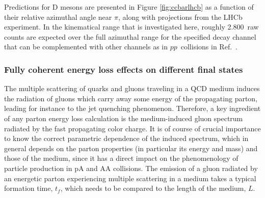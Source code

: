 \documentclass[../report.tex]{subfiles}
\begin{document}
Predictions for D mesons are presented in Figure \ref{fig:ccbarlhcb} as a function of their relative azimuthal angle near $\pi$, along with projections from the LHCb experiment. In the \pPb kinematical range that is investigated here, roughly 2.800~raw counts are expected over the full azimuthal range for the specified decay channel that can be complemented with other channels as in $pp$~collisions in Ref.~\cite{Aaij:2012dz}. %




\subsubsection{Fully coherent energy loss effects on different final states}
\label{subsubsec:coherent}

The multiple scattering of quarks and gluons traveling in a QCD medium induces the radiation of gluons which carry away some energy of the propagating parton, leading for instance to the jet quenching phenomenon. Therefore, a key ingredient of any parton energy loss calculation is  the medium-induced gluon spectrum radiated by the fast propagating color charge. It is of course of crucial importance to know the correct parametric dependence of the induced spectrum, which in general depends on the parton properties (in particular its energy and mass) and those of the medium, since it has a direct impact on the phenomenology of particle production in pA and AA collisions. The emission of a gluon radiated by an energetic parton experiencing multiple scattering in a medium takes a typical formation time, $t_f$, which needs to be compared to the length of the medium, $L$.
\end{document}
